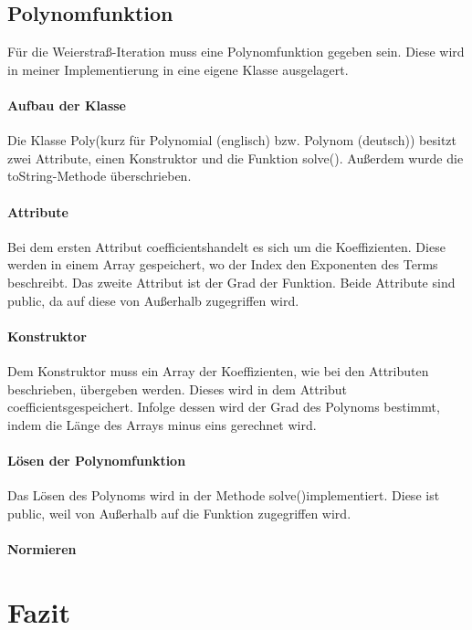 \documentclass[12pt]{article}
\begin{document}
\subsection{Polynomfunktion}
Für die Weierstraß-Iteration muss eine Polynomfunktion gegeben sein. Diese wird in meiner Implementierung in eine eigene Klasse ausgelagert.

\paragraph{Aufbau der Klasse}
Die Klasse \glqq Poly\grqq\space (kurz für Polynomial (englisch) bzw. Polynom (deutsch)) besitzt zwei Attribute, einen Konstruktor und die Funktion \glqq solve()\grqq. Außerdem wurde die \glqq toString\grqq -Methode überschrieben.

\paragraph{Attribute}
Bei dem ersten Attribut \glqq coefficients\grqq\space handelt es sich um die Koeffizienten. Diese werden in einem Array gespeichert, wo der Index den Exponenten des Terms beschreibt. Das zweite Attribut ist der Grad der Funktion. Beide Attribute sind \glqq public\grqq, da auf diese von Außerhalb zugegriffen wird.

\paragraph{Konstruktor}
Dem Konstruktor muss ein Array der Koeffizienten, wie bei den Attributen beschrieben, übergeben werden. Dieses wird in dem Attribut \glqq coefficients\grqq\space gespeichert. Infolge dessen wird der Grad des Polynoms bestimmt, indem die Länge des Arrays minus eins gerechnet wird.

\paragraph{Lösen der Polynomfunktion}
Das Lösen des Polynoms wird in der Methode \glqq solve()\grqq\space implementiert. Diese ist \glqq public\grqq, weil von Außerhalb auf die Funktion zugegriffen wird. 

\paragraph{Normieren}

\section{Fazit}
\end{document}
